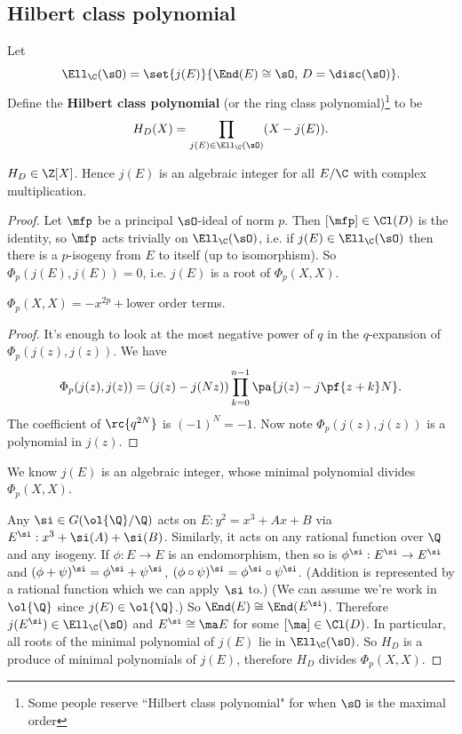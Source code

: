 \subsection{Hilbert class polynomial}
\begin{df}
Let 
\[\Ell_{\C}(\sO)=\set{j(E)}{\End(E)\cong \sO,\,D=\disc(\sO)}.\]
Define the \textbf{Hilbert class polynomial} (or the ring class polynomial)\footnote{Some people reserve ``Hilbert class polynomial" for when $\sO$ is the maximal order} to be 
\[
H_D(X)=\prod_{j(E)\in \Ell_{\C}(\sO)}(X-j(E)).
\]
\end{df}
\begin{thm}
$H_D\in \Z[X]$. 
Hence $j(E)$ is an algebraic integer for all $E/\C$ with complex multiplication.
\end{thm}
\begin{proof}
Let $\mfp$ be a principal $\sO$-ideal of norm $p$. %
Then $[\mfp]\in \Cl(D)$ is the identity, so $\mfp$ acts trivially on $\Ell_{\C}(\sO)$, i.e. if $j(E)\in \Ell_{\C}(\sO)$ then there is a $p$-isogeny from $E$ to itself (up to isomorphism). So $\Phi_p(j(E),j(E))=0$, i.e. $j(E)$ is a root of $\Phi_p(X,X)$.
\begin{lem}
$\Phi_p(X,X)=-x^{2p}+$lower order terms.
\end{lem}
\begin{proof}
It's enough to look at the most negative power of $q$ in the $q$-expansion of $\Phi_p(j(z),j(z))$. We have
\[
\Phi_p(j(z),j(z))=(j(z)-j(Nz))\prod_{k=0}^{n-1}\pa{j(z)-j\pf{z+k}N}.
\]
The coefficient of $\rc{q^{2N}}$ is $(-1)^N=-1$. Now note $\Phi_p(j(z),j(z))$ is a polynomial in $j(z)$.
\end{proof}
We know $j(E)$ is an algebraic integer, whose minimal polynomial divides $\Phi_p(X,X)$.

Any $\si\in G(\ol{\Q}/\Q)$ acts on $E:y^2=x^3+Ax+B$ via $E^{\si}:x^3+\si(A)+\si(B)$. Similarly, it acts on any rational function over $\Q$ and any isogeny. If $\phi:E\to E$ is an endomorphism, then so is $\phi^{\si}:E^{\si}\to E^{\si}$ and $(\phi+\psi)^{\si}=\phi^{\si}+\psi^{\si}$, $(\phi\circ \psi)^{\si}=\phi^{\si}\circ \psi^{\si}$. (Addition is represented by a rational function which we can apply $\si$ to.)
(We can assume we're work in $\ol{\Q}$ since $j(E)\in \ol{\Q}$.)
So $\End(E)\cong \End(E^{\si})$. Therefore $j(E^{\si})\in \Ell_{\C}(\sO)$ and $E^{\si}\cong \ma E$ for some $[\ma]\in \Cl(D)$. In particular, all roots of the minimal polynomial of $j(E)$ lie in $\Ell_{\C}(\sO)$. So $H_D$ is a produce of minimal polynomials of $j(E)$, therefore $H_D$ divides $\Phi_p(X,X)$.


\end{proof}

